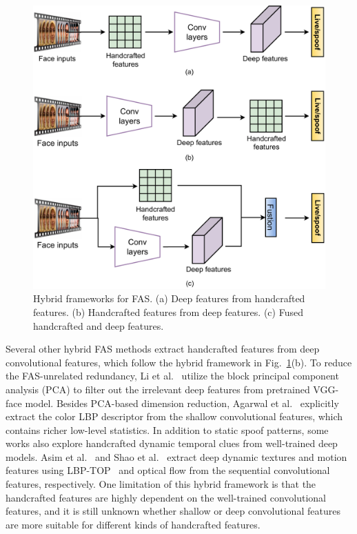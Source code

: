 \documentclass[10pt,journal,compsoc]{IEEEtran}
\begin{document}
\begin{figure}
\centering
\includegraphics[scale=0.47]{Figures/hybrid.pdf}
  \caption{ 
   Hybrid frameworks for FAS. (a) Deep features from handcrafted features. (b) Handcrafted features from deep features. (c) Fused handcrafted and deep features.
  }
\label{fig:hybrid}
\end{figure}


Several other hybrid FAS methods extract handcrafted features from deep convolutional features, which follow the hybrid framework in Fig.~\ref{fig:hybrid}(b). To reduce the FAS-unrelated redundancy, Li et al.~\cite{Li2017An} utilize the block principal component analysis (PCA) to filter out the irrelevant deep features from pretrained VGG-face model. Besides PCA-based dimension reduction, Agarwal et al.~\cite{agarwal2019chif} explicitly extract the color LBP descriptor from the shallow convolutional features, which contains richer low-level statistics. In addition to static spoof patterns, some works also explore handcrafted dynamic temporal clues from well-trained deep models. Asim et al.~\cite{asim2017cnn} and Shao et al.~\cite{shao2018joint} extract deep dynamic textures and motion features using LBP-TOP~\cite{zhao2007dynamic} and optical flow from the sequential convolutional features, respectively. One limitation of this hybrid framework is that the handcrafted features are highly dependent on the well-trained convolutional features, and it is still unknown whether shallow or deep convolutional features are more suitable for different kinds of handcrafted features.
\end{document}
